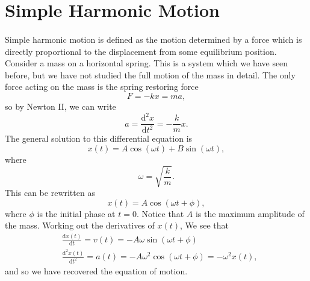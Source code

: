 \documentclass[../classical_mechanics.tex]{subfiles}
\begin{document}
    \section{Simple Harmonic Motion}
        \paragraph{}
        Simple harmonic motion is defined as the motion determined by a force which is directly proportional to the displacement from some equilibrium position.
        Consider a mass on a horizontal spring. This is a system which we have seen before, but we have not studied the full motion of the mass in detail.
        The only force acting on the mass is the spring restoring force
        \begin{equation}
            F = -kx = ma,
        \end{equation}
        so by Newton II, we can write
        \begin{equation}\label{eq-SHM-spring}
            a = \frac{\mathrm{d}^2x}{\mathrm{d}t^2}=-\frac{k}{m}x.
        \end{equation}
        The general solution to this differential equation is
        \begin{equation}
            x(t)=A\cos(\omega t) + B\sin(\omega t),
        \end{equation}
        where
        \begin{equation}
            \omega=\sqrt{\frac{k}{m}}.
        \end{equation}
        This can be rewritten as
        \begin{equation}
            x(t) = A\cos(\omega t + \phi),
        \end{equation}
        where $\phi$ is the initial phase at $t=0$.
        Notice that $A$ is the maximum amplitude of the mass. 
        Working out the derivatives of $x(t)$, We see that
        \begin{align}
            &\frac{\mathrm{d}x(t)}{\mathrm{d}t} = v(t) = -A\omega\sin(\omega t + \phi)\\
            &\frac{\mathrm{d}^2x(t)}{\mathrm{d}t^2} = a(t) = -A\omega^2\cos(\omega t + \phi) = -\omega^2x(t),
        \end{align}
        and so we have recovered the equation of motion.
\end{document}
